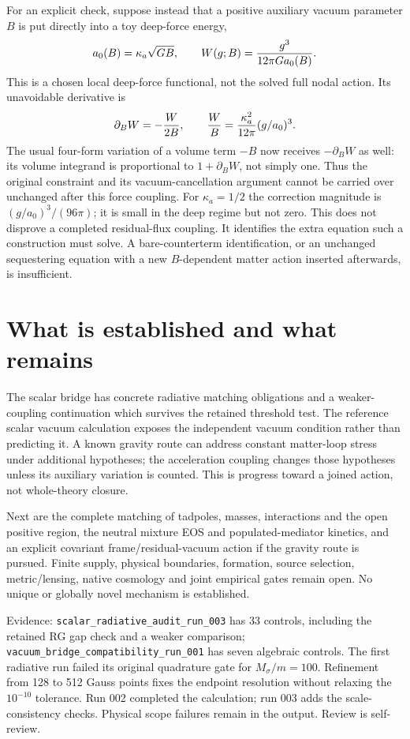 \documentclass[11pt]{article}
\begin{document}
For an explicit check, suppose instead that a positive auxiliary vacuum
parameter $B$ is put directly into a toy deep-force energy,
\begin{equation}
 a_0(B)=\kappa_a\sqrt{GB},\qquad
 W(g;B)={g^3\over12\pi G a_0(B)}.
\end{equation}
This is a chosen local deep-force functional, not the solved full nodal
action. Its unavoidable derivative is
\begin{equation}
 \partial_B W=-{W\over2B},\qquad
 {W\over B}={\kappa_a^2\over12\pi}(g/a_0)^3.
\end{equation}
The usual four-form variation of a volume term $-B$ now receives
$-\partial_BW$ as well: its volume integrand is proportional to
$1+\partial_BW$, not simply one. Thus the original constraint and its
vacuum-cancellation argument cannot be carried over unchanged after this
force coupling. For $\kappa_a=1/2$ the correction magnitude is
$(g/a_0)^3/(96\pi)$; it is small in the deep regime but not zero.
This does not disprove a completed residual-flux coupling. It identifies
the extra equation such a construction must solve. A bare-counterterm
identification, or an unchanged sequestering equation with a new
$B$-dependent matter action inserted afterwards, is insufficient.

\section{What is established and what remains}
The scalar bridge has concrete radiative matching obligations and a
weaker-coupling continuation which survives the retained threshold test.
The reference scalar vacuum calculation exposes the independent vacuum
condition rather than predicting it. A known gravity route can address
constant matter-loop stress under additional hypotheses; the acceleration
coupling changes those hypotheses unless its auxiliary variation is counted.
This is progress toward a joined action, not whole-theory closure.

Next are the complete matching of tadpoles, masses, interactions and the
open positive region, the neutral mixture EOS and populated-mediator
kinetics, and an explicit covariant frame/residual-vacuum action if the
gravity route is pursued. Finite supply, physical boundaries, formation,
source selection, metric/lensing, native cosmology and joint empirical
gates remain open. No unique or globally novel mechanism is established.

Evidence: \texttt{scalar\_radiative\_audit\_run\_003} has 33 controls,
including the retained RG gap check and a weaker comparison;
\texttt{vacuum\_bridge\_compatibility\_run\_001} has seven algebraic
controls. The first radiative run failed its original quadrature gate for
$M_\sigma/m=100$. Refinement from 128 to 512 Gauss points fixes the
endpoint resolution without relaxing the $10^{-10}$ tolerance. Run 002
completed the calculation; run 003 adds the scale-consistency checks.
Physical scope failures remain in the output. Review is self-review.
\end{document}
